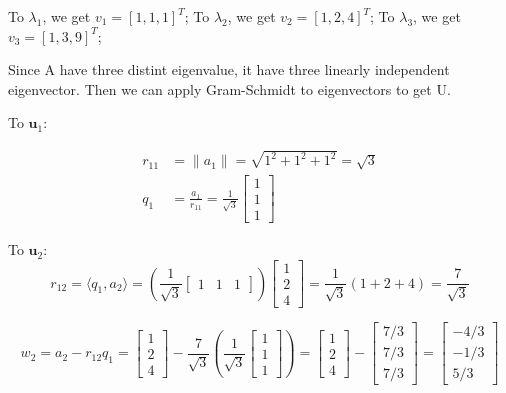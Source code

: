 \documentclass{article}
\newcommand{\0}{{\mathbf{0}}} %
\begin{document}
To $\lambda_1$, we get $v_1 = [1, 1, 1]^T$;
To $\lambda_2$, we get $v_2 = [1, 2, 4]^T$;
To $\lambda_3$, we get $v_3 = [1, 3, 9]^T$;

Since A have three distint eigenvalue, it have three linearly independent eigenvector.
Then we can apply Gram-Schmidt to eigenvectors to get U.

To $\mathbf{u}_1$:

$$
\begin{aligned}
r_{11} &= \|a_1\| = \sqrt{1^2 + 1^2 + 1^2} = \sqrt{3} \\
q_1 &= \frac{a_1}{r_{11}} = \frac{1}{\sqrt{3}}
\begin{bmatrix} 1 \\ 1 \\ 1
\end{bmatrix}
\end{aligned}$$

To $\mathbf{u}_2$:
$$r_{12} = \langle q_1, a_2 \rangle = \left( \frac{1}{\sqrt{3}}
\begin{bmatrix} 1 & 1 & 1
\end{bmatrix} \right)
\begin{bmatrix} 1 \\ 2 \\ 4
\end{bmatrix} = \frac{1}{\sqrt{3}}(1+2+4) = \frac{7}{\sqrt{3}}$$

$$w_2 = a_2 - r_{12} q_1 =
\begin{bmatrix} 1 \\ 2 \\ 4
\end{bmatrix} - \frac{7}{\sqrt{3}} \left( \frac{1}{\sqrt{3}}
\begin{bmatrix} 1 \\ 1 \\ 1
\end{bmatrix} \right)
=
\begin{bmatrix} 1 \\ 2 \\ 4
\end{bmatrix} -
\begin{bmatrix} 7/3 \\ 7/3 \\ 7/3
\end{bmatrix}
=
\begin{bmatrix} -4/3 \\ -1/3 \\ 5/3
\end{bmatrix}$$
\end{document}
